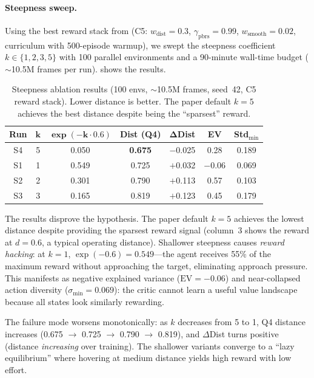 \documentclass[11pt]{article}
\begin{document}
\paragraph{Steepness sweep.}
Using the best reward stack from  (C5: $w_{\text{dist}} = 0.3$, $\gamma_{\text{pbrs}} = 0.99$, $w_{\text{smooth}} = 0.02$, curriculum with 500-episode warmup), we swept the steepness coefficient $k \in \{1, 2, 3, 5\}$ with 100 parallel environments and a 90-minute wall-time budget (${\sim}$10.5M frames per run).
 shows the results.

\begin{table}[H]
  \centering
  \small
  \renewcommand{\arraystretch}{1.3}
  \caption{Steepness ablation results (100 envs, ${\sim}$10.5M frames, seed~42, C5 reward stack). Lower distance is better. The paper default $k{=}5$ achieves the best distance despite being the ``sparsest'' reward.}
  \label{tab:steepness-results}
  \begin{tabular}{@{}ccccccc@{}}
    \toprule
    \textbf{Run} & $\boldsymbol{k}$ & \textbf{$\boldsymbol{\exp(-k \cdot 0.6)}$} & \textbf{Dist (Q4)} & $\boldsymbol{\Delta}$\textbf{Dist} & \textbf{EV} & \textbf{Std$_{\min}$} \\
    \midrule
    S4 & 5 & 0.050 & \textbf{0.675} & $-$0.025 & 0.28 & 0.189 \\
    S1 & 1 & 0.549 & 0.725          & $+$0.032 & $-$0.06 & 0.069 \\
    S2 & 2 & 0.301 & 0.790          & $+$0.113 & 0.57 & 0.103 \\
    S3 & 3 & 0.165 & 0.819          & $+$0.123 & 0.45 & 0.179 \\
    \bottomrule
  \end{tabular}
\end{table}

\noindent
The results disprove the hypothesis.
The paper default $k{=}5$ achieves the lowest distance despite providing the sparsest reward signal (column~3 shows the reward at $d{=}0.6$, a typical operating distance).
Shallower steepness causes \emph{reward hacking}: at $k{=}1$, $\exp(-0.6) = 0.549$---the agent receives 55\% of the maximum reward without approaching the target, eliminating approach pressure.
This manifests as negative explained variance ($\text{EV} = -0.06$) and near-collapsed action diversity ($\sigma_{\min} = 0.069$): the critic cannot learn a useful value landscape because all states look similarly rewarding.

The failure mode worsens monotonically: as $k$ decreases from 5 to 1, Q4 distance increases (0.675 $\to$ 0.725 $\to$ 0.790 $\to$ 0.819), and $\Delta$Dist turns positive (distance \emph{increasing} over training).
The shallower variants converge to a ``lazy equilibrium'' where hovering at medium distance yields high reward with low effort.
\end{document}
